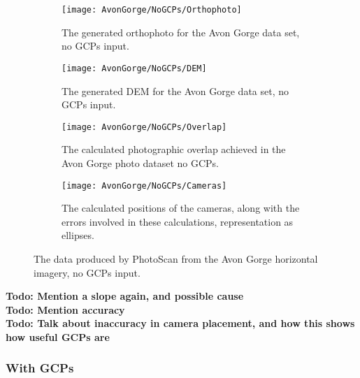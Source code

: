 \begin{figure}
    \centering
    \begin{subfigure}[b]{0.24\textwidth}
        \texttt{[image: AvonGorge/NoGCPs/Orthophoto]}
        \caption{The generated orthophoto for the Avon Gorge data set, no
        GCPs input.}
        \label{img:avon-gorge/no-gcps/orthophoto}
    \end{subfigure}
    \begin{subfigure}[b]{0.24\textwidth}
        \texttt{[image: AvonGorge/NoGCPs/DEM]}
        \caption{The generated DEM for the Avon Gorge data set, no GCPs input.}
        \label{img:avon-gorge/no-gcps/dem}
    \end{subfigure}
    \begin{subfigure}[b]{0.24\textwidth}
        \texttt{[image: AvonGorge/NoGCPs/Overlap]}
        \caption{The calculated photographic overlap achieved in the Avon Gorge
        photo dataset no GCPs.}
        \label{img:avon-gorge/no-gcps/overlap}
    \end{subfigure}
    \begin{subfigure}[b]{0.24\textwidth}
        \texttt{[image: AvonGorge/NoGCPs/Cameras]}
        \caption{The calculated positions of the cameras, along with the errors
        involved in these calculations, representation as ellipses.}
        \label{img:avon-gorge/no-gcps/cameras}
    \end{subfigure}
    \caption{The data produced by PhotoScan from the Avon Gorge horizontal
    imagery, no GCPs input.}
    \label{img:avon-gorge/no-gcps}
\end{figure}

\textbf{Todo: Mention a slope again, and possible cause} \\
\textbf{Todo: Mention accuracy} \\
\textbf{Todo: Talk about inaccuracy in camera placement, and how this shows how
useful GCPs are} \\

\subsubsection{With GCPs}

